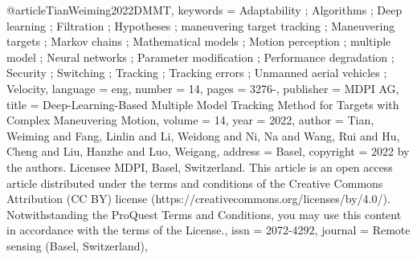 @article{TianWeiming2022DMMT,
keywords = {Adaptability ; Algorithms ; Deep learning ; Filtration ; Hypotheses ; maneuvering target tracking ; Maneuvering targets ; Markov chains ; Mathematical models ; Motion perception ; multiple model ; Neural networks ; Parameter modification ; Performance degradation ; Security ; Switching ; Tracking ; Tracking errors ; Unmanned aerial vehicles ; Velocity},
language = {eng},
number = {14},
pages = {3276-},
publisher = {MDPI AG},
title = {Deep-Learning-Based Multiple Model Tracking Method for Targets with Complex Maneuvering Motion},
volume = {14},
year = {2022},
author = {Tian, Weiming and Fang, Linlin and Li, Weidong and Ni, Na and Wang, Rui and Hu, Cheng and Liu, Hanzhe and Luo, Weigang},
address = {Basel},
copyright = {2022 by the authors. Licensee MDPI, Basel, Switzerland. This article is an open access article distributed under the terms and conditions of the Creative Commons Attribution (CC BY) license (https://creativecommons.org/licenses/by/4.0/). Notwithstanding the ProQuest Terms and Conditions, you may use this content in accordance with the terms of the License.},
issn = {2072-4292},
journal = {Remote sensing (Basel, Switzerland)},
}


